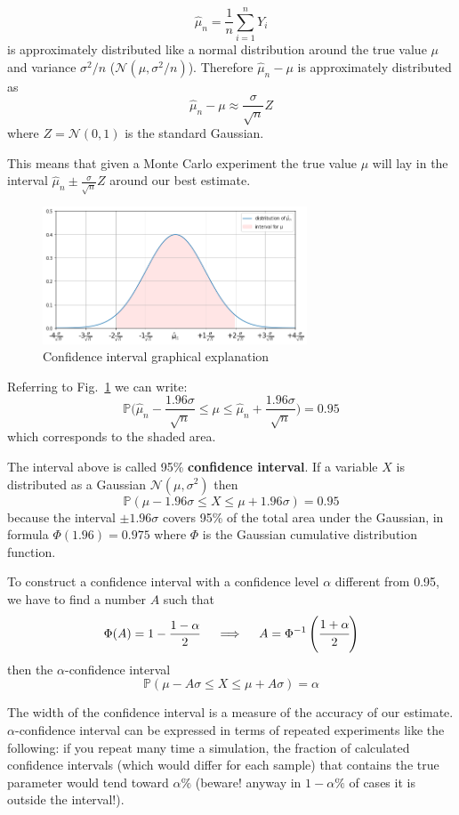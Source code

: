 \[ \hat{\mu}_n = \frac{1}{n}\sum_{i=1}^{n}Y_i\]
is approximately distributed like a normal distribution around the true value $\mu$ and variance $\sigma^2 /n$ ($\mathcal{N}(\mu ,\sigma^2 /n)$). Therefore \( \hat{\mu}_n - \mu \) is approximately distributed as 
\[ \hat{\mu}_n - \mu \approx \frac{\sigma}{\sqrt{n}}Z \]
where $Z=\mathcal{N}(0, 1)$ is the standard Gaussian.

This means that given a Monte Carlo experiment the true value $\mu$ will lay in the interval $\hat{\mu}_n \pm  \frac{\sigma}{\sqrt{n}}Z$ around our best estimate. 
\begin{figure}[h]
\centering
\includegraphics[width=0.7\textwidth]{confidence_interval.png}
\caption{Confidence interval graphical explanation}
\label{fig:confidence}
\end{figure}
Referring to Fig.~\ref{fig:confidence} we can write:
\[\mathbb{P}\Big(\hat{\mu}_n - \frac{1.96\sigma}{\sqrt{n}} \le \mu \le \hat{\mu}_n + \frac{1.96\sigma}{\sqrt{n}}\Big) = 0.95 \]
which corresponds to the shaded area.

The interval above is called 95\% \textbf{confidence interval}. If a variable $X$ is distributed as a Gaussian $\mathcal{N}(\mu, \sigma^2)$ then
\[\mathbb{P}(\mu - 1.96\sigma \le X \le \mu+ 1.96\sigma) = 0.95 \]
because the interval $\pm 1.96\sigma$ covers 95\% of the total area under the Gaussian, in formula $\Phi(1.96)=0.975$ where $\Phi$ is the Gaussian cumulative distribution function.

To construct a confidence interval with a confidence level $\alpha$ different from 0.95, we have to find a number $A$ such that
\begin{equation}
  \Phi(A) = 1 - \frac{1-\alpha}{2}\quad\implies\quad A = \Phi^{-1}\left(\cfrac{1+\alpha}{2}\right)
  \label{for:A}
\end{equation}
then the $\alpha$-confidence interval
\[\mathbb{P}(\mu - A\sigma \le X \le \mu+ A\sigma) = \alpha \]

The width of the confidence interval is a measure of the accuracy of our estimate.
$\alpha$-confidence interval can be expressed in terms of repeated
experiments like the following: if you repeat many time a simulation,
the fraction of calculated confidence intervals (which would differ for each sample) that contains
the true parameter would tend toward $\alpha \%$ (beware! anyway in $1-\alpha\%$ of cases it is outside the interval!).

